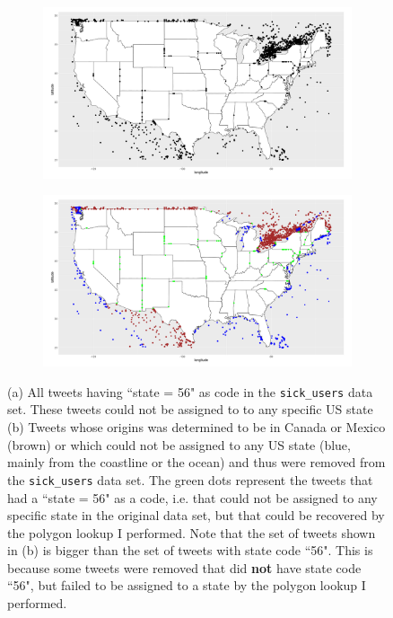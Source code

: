 \documentclass[11pt, a4paper,twoside]{report}\usepackage[]{graphicx}\usepackage[]{color}
\begin{document}
\begin{figure}[H]
  \centering
    \begin{subfigure}[t]{0.9\textwidth}
    \includegraphics[width=1\linewidth]{state56_sick_raw_df.png}
    \caption{}
  \end{subfigure}
  \begin{subfigure}[t]{0.9\textwidth}
  \includegraphics[width=1\linewidth]{CanexicoAndRemoved_sick_raw_df.png}
  \caption{}
  \end{subfigure}
  \caption{(a) All tweets having ``state = 56" as code in the \texttt{sick\_users} data set. These tweets could not be assigned to to any specific US state (b) Tweets whose origins was determined to be in Canada or Mexico (brown) or which could not be assigned to any US state (blue, mainly from the coastline or the ocean) and thus were removed from the \texttt{sick\_users} data set. The green dots represent the tweets that had a ``state = 56" as  a code, i.e. that could not be assigned to any specific state in the original data set, but that could be recovered by the polygon lookup I performed. Note that the set of tweets shown in (b) is bigger than the set of tweets with state code ``56". This is because some tweets were removed that did \textbf{not} have state code ``56", but failed to be assigned to a state by the polygon lookup I performed.}
  \label{fig:canexico_and_removed}
  \end{figure}
\end{document}
